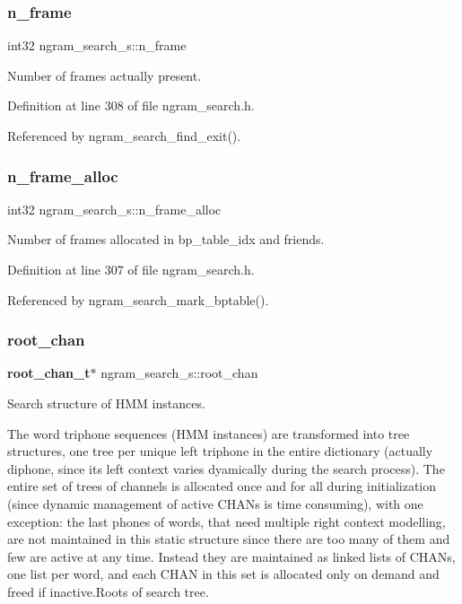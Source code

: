 \subsubsection{n\+\_\+frame}
{\footnotesize\ttfamily int32 ngram\+\_\+search\+\_\+s\+::n\+\_\+frame}



Number of frames actually present. 



Definition at line 308 of file ngram\+\_\+search.\+h.



Referenced by ngram\+\_\+search\+\_\+find\+\_\+exit().

\mbox{\label{structngram__search__s_a38ea5de504b3d7ad2390a3f8966d502f}} 
\subsubsection{n\+\_\+frame\+\_\+alloc}
{\footnotesize\ttfamily int32 ngram\+\_\+search\+\_\+s\+::n\+\_\+frame\+\_\+alloc}



Number of frames allocated in bp\+\_\+table\+\_\+idx and friends. 



Definition at line 307 of file ngram\+\_\+search.\+h.



Referenced by ngram\+\_\+search\+\_\+mark\+\_\+bptable().

\mbox{\label{structngram__search__s_ae1b0a51cfcddc1e4b6ac94fa1e48887a}} 
\subsubsection{root\+\_\+chan}
{\footnotesize\ttfamily \textbf{ root\+\_\+chan\+\_\+t}$\ast$ ngram\+\_\+search\+\_\+s\+::root\+\_\+chan}



Search structure of H\+MM instances. 

The word triphone sequences (H\+MM instances) are transformed into tree structures, one tree per unique left triphone in the entire dictionary (actually diphone, since its left context varies dyamically during the search process). The entire set of trees of channels is allocated once and for all during initialization (since dynamic management of active C\+H\+A\+Ns is time consuming), with one exception\+: the last phones of words, that need multiple right context modelling, are not maintained in this static structure since there are too many of them and few are active at any time. Instead they are maintained as linked lists of C\+H\+A\+Ns, one list per word, and each C\+H\+AN in this set is allocated only on demand and freed if inactive.\+Roots of search tree. 

